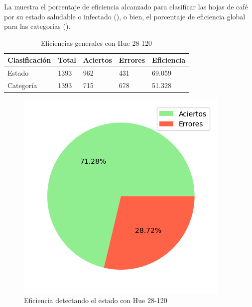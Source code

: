 La  muestra el porcentaje de eficiencia alcanzado para clasificar las hojas de café por su estado saludable o infectado (), o bien, el porcentaje de eficiencia global para las categorías ().

\begin{table}[h!]
\centering
\begin{tabular}{|l|l|l|l|l|}
\hline 
\textbf{Clasificación} & \textbf{Total} & \textbf{Aciertos} & \textbf{Errores} & \textbf{Eficiencia} \\
\hline
Estado & 1393 & 962 & 431 & 69.059 \\
\hline 
Categoría & 1393 & 715 & 678 & 51.328 \\
\hline 
\end{tabular}
\caption{Eficiencias generales con Hue 28-120}
\label{table:efficiency_general_28_120}
\end{table}

\captionsetup[figure]{skip=-10pt}

\begin{figure}[H]
\centering
\includegraphics[scale=0.6]{images/result_global_state_28_120.png}
\caption{Eficiencia detectando el estado con Hue 28-120}
\label{img:efficiency_state_28_120}
\end{figure}

